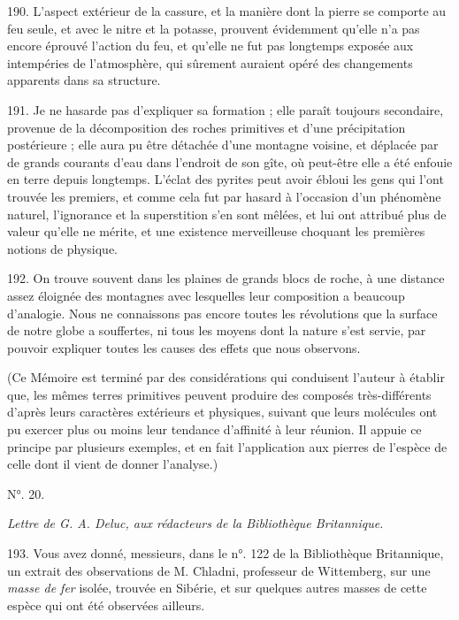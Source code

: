 \documentclass[a4paper, 11pt, oneside, polutonikogreek, french]{article}
\begin{document}
190. L'aspect extérieur de la cassure, et la manière dont la pierre se comporte au feu seule, et avec le nitre et la potasse, prouvent évidemment qu'elle n'a pas encore éprouvé l'action du feu, et qu'elle ne fut pas longtemps exposée aux intempéries de l'atmosphère, qui sûrement auraient opéré des changements apparents dans sa structure.

191. Je ne hasarde pas d'expliquer sa formation ; elle paraît toujours secondaire, provenue de la décomposition des roches primitives et d'une précipitation postérieure ; elle aura pu être détachée d'une montagne voisine, et déplacée par de grands courants d'eau dans l'endroit de son gîte, où peut-être elle a été enfouie en terre depuis longtemps. L'éclat des pyrites peut avoir ébloui les gens qui l'ont trouvée les premiers, et comme cela fut par hasard à l'occasion d'un phénomène naturel, l'ignorance et la superstition s'en sont mêlées, et lui ont attribué plus de valeur qu'elle ne mérite, et une existence merveilleuse choquant les premières notions de physique.

192. On trouve souvent dans les plaines de grands blocs de roche, à une distance assez éloignée des montagnes avec lesquelles leur composition a beaucoup d'analogie. Nous ne connaissons pas encore toutes les révolutions que la surface de notre globe a souffertes, ni tous les moyens dont la nature s'est servie, par pouvoir expliquer toutes les causes des effets que nous observons.

(Ce Mémoire est terminé par des considérations qui conduisent l'auteur à établir que, \og les mêmes terres primitives peuvent produire des composés très-différents d'après leurs caractères extérieurs et physiques, suivant que leurs molécules ont pu exercer plus ou moins leur tendance d'affinité à leur réunion. \fg Il appuie ce principe par plusieurs exemples, et en fait l'application aux pierres de l'espèce de celle dont il vient de donner l'analyse.)

\begin{center}
N°. 20.
\end{center}

\emph{Lettre de G. A. Deluc, aux rédacteurs de la Bibliothèque Britannique.}

193. \og Vous avez donné, messieurs, dans le n°. 122 de la Bibliothèque Britannique, un extrait des observations de M. Chladni, professeur de Wittemberg, sur une \emph{masse de fer} isolée, trouvée en Sibérie, et sur quelques autres masses de cette espèce qui ont été observées ailleurs. \fg
\end{document}
